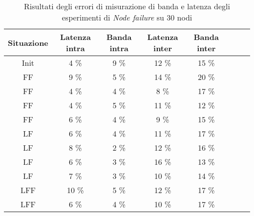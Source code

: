     \begin{table}[H]
    \caption{Risultati degli errori di misurazione di banda e latenza degli esperimenti di \textit{Node failure} su 30 nodi}
    \label{tab:nodefail30qos2}
    \begin{center}
        \begin{tabular}{|c|c|c|c|c|c|c|c|}
            \hline
            Situazione & Latenza intra & Banda intra & Latenza inter & Banda inter\\
            \hline
            Init & 4 \%   & 9 \%   & 12 \%  & 15 \%  \\
            FF    & 9 \%   & 5 \%   & 14 \%  & 20 \%   \\
            FF    & 4 \%   & 4 \%   & 8 \%   & 17 \%   \\
            FF    & 4 \%   & 5 \%   & 11 \%  & 12 \%   \\
            FF    & 6 \%   & 4 \%   & 9 \%   & 15 \%   \\
            LF    & 6 \%   & 4 \%   & 11 \%  & 17 \%   \\
            LF    & 8 \%   & 2 \%   & 12 \%  & 16 \%   \\
            LF    & 6 \%   & 3 \%   & 16 \%  & 13 \%   \\
            LF    & 7 \%   & 3 \%   & 10 \%  & 14 \%   \\
            LFF    & 10 \%  & 5 \%   & 12 \%  & 17 \%   \\
            LFF   & 6 \%   & 4 \%   & 10 \%  & 17 \%   \\
            \hline
        \end{tabular}
        \end{center}
    \end{table}
    
